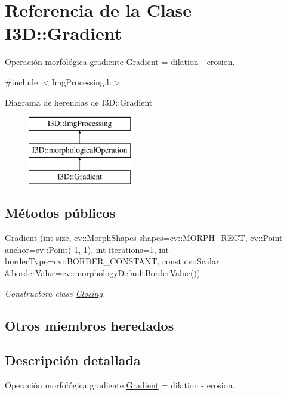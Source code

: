 \hypertarget{class_i3_d_1_1_gradient}{}\section{Referencia de la Clase I3D\+:\+:Gradient}
\label{class_i3_d_1_1_gradient}


Operación morfológica gradiente \hyperlink{class_i3_d_1_1_gradient}{Gradient} = dilation -\/ erosion.  




{\ttfamily \#include $<$Img\+Processing.\+h$>$}

Diagrama de herencias de I3D\+:\+:Gradient\begin{figure}[H]
\begin{center}
\leavevmode
\includegraphics[height=3.000000cm]{class_i3_d_1_1_gradient}
\end{center}
\end{figure}
\subsection*{Métodos públicos}
\begin{DoxyCompactItemize}
\item 
\hyperlink{class_i3_d_1_1_gradient_a42a6683ae715e8c86dfd9bee662f01e5}{Gradient} (int size, cv\+::\+Morph\+Shapes shapes=cv\+::\+M\+O\+R\+P\+H\+\_\+\+R\+E\+CT, cv\+::\+Point anchor=cv\+::\+Point(-\/1,-\/1), int iterations=1, int border\+Type=cv\+::\+B\+O\+R\+D\+E\+R\+\_\+\+C\+O\+N\+S\+T\+A\+NT, const cv\+::\+Scalar \&border\+Value=cv\+::morphology\+Default\+Border\+Value())
\begin{DoxyCompactList}\small\item\em Constructora clase \hyperlink{class_i3_d_1_1_closing}{Closing}. \end{DoxyCompactList}\end{DoxyCompactItemize}
\subsection*{Otros miembros heredados}


\subsection{Descripción detallada}
Operación morfológica gradiente \hyperlink{class_i3_d_1_1_gradient}{Gradient} = dilation -\/ erosion. 


